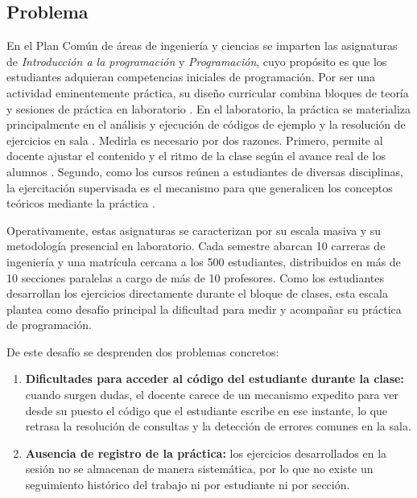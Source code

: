 \subsection{Problema}
\label{subsec:problema}

En el Plan Común de áreas de ingeniería y ciencias se imparten las asignaturas de \textit{Introducción a la programación} y \textit{Programación}, cuyo propósito es que los estudiantes adquieran competencias iniciales de programación. Por ser una actividad eminentemente práctica, su diseño curricular combina bloques de teoría y sesiones de práctica en laboratorio \cite{luxton2018introductory}. En el laboratorio, la práctica se materializa principalmente en el análisis y ejecución de códigos de ejemplo y la resolución de ejercicios en sala \cite{zhi2019worked}. Medirla es necesario por dos razones. Primero, permite al docente ajustar el contenido y el ritmo de la clase según el avance real de los alumnos \cite{medeiros2019systematic}. Segundo, como los cursos reúnen a estudiantes de diversas disciplinas, la ejercitación supervisada es el mecanismo para que generalicen los conceptos teóricos mediante la práctica \cite{luxton2018introductory, zhi2019worked}.

Operativamente, estas asignaturas se caracterizan por su escala masiva y su metodología presencial en laboratorio. Cada semestre abarcan 10 carreras de ingeniería \cite{uv2026carreras} y una matrícula cercana a los 500 estudiantes, distribuidos en más de 10 secciones paralelas a cargo de más de 10 profesores. Como los estudiantes desarrollan los ejercicios directamente durante el bloque de clases, esta escala plantea como desafío principal la dificultad para medir y acompañar su práctica de programación.

De este desafío se desprenden dos problemas concretos:
\begin{enumerate}
    \item \textbf{Dificultades para acceder al código del estudiante durante la clase:} cuando surgen dudas, el docente carece de un mecanismo expedito para ver desde su puesto el código que el estudiante escribe en ese instante, lo que retrasa la resolución de consultas y la detección de errores comunes en la sala.
    \item \textbf{Ausencia de registro de la práctica:} los ejercicios desarrollados en la sesión no se almacenan de manera sistemática, por lo que no existe un seguimiento histórico del trabajo ni por estudiante ni por sección.
\end{enumerate}

